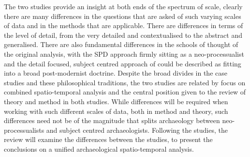 The two studies provide an insight at both ends of the spectrum of scale, clearly there are many differences in the questions that are asked of such varying scales of data and in the methods that are applicable. There are differences in terms of the level of detail, from the very detailed and contextualised to the abstract and generalised. There are also fundamental differences in the schools of thought of the original analysis, with the SPD approach firmly sitting as a neo-processualist and the detail focused, subject centred approach of \citet{Whittle:2011kl} could be described as fitting into a broad post-modernist doctrine. Despite the broad divides in the case studies and these philosophical traditions, the two studies are related by focus on combined spatio-temporal analysis and the central position given to the review of theory and method in both studies. While differences will be required when working with such different scales of data, both in method and theory, such differences need not be of the magnitude that splits archaeology between neo-processualists and subject centred archaeologists. Following the studies, the review will examine the differences between the studies, to present the conclusions on a unified archaeological spatio-temporal analysis. 

